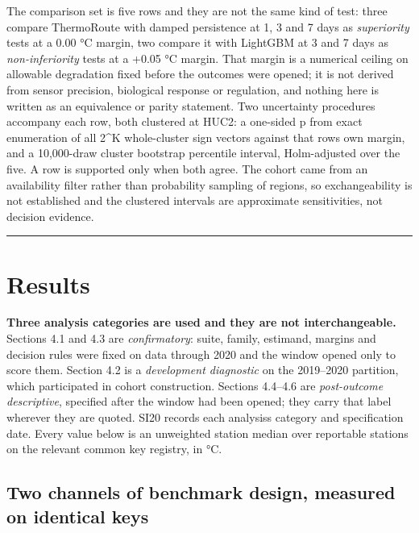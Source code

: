 The comparison set is five rows and they are not the same kind of test: three
compare ThermoRoute with damped persistence at 1, 3 and 7 days as \emph{superiority}
tests at a 0.00 °C margin, two compare it with LightGBM at 3 and 7 days as
\emph{non-inferiority} tests at a +0.05 °C margin. That margin is a numerical ceiling
on allowable degradation fixed before the outcomes were opened; it is not derived
from sensor precision, biological response or regulation, and nothing here is
written as an equivalence or parity statement. Two uncertainty procedures
accompany each row, both clustered at HUC2: a one-sided p from exact enumeration
of all 2\^{}K whole-cluster sign vectors against that row\textquotesingle s own margin, and a
10,000-draw cluster bootstrap percentile interval, Holm-adjusted
\cite{holm1979simple} over the five. A row is
supported only when both agree. The cohort came from an availability filter
rather than probability sampling of regions, so exchangeability is not
established and the clustered intervals are approximate sensitivities, not
decision evidence.

\begin{center}\rule{0.5\linewidth}{0.5pt}\end{center}

\section{Results}\label{results}

\textbf{Three analysis categories are used and they are not interchangeable.} Sections
4.1 and 4.3 are \emph{confirmatory}: suite, family, estimand, margins and decision
rules were fixed on data through 2020 and the window opened only to score them.
Section 4.2 is a \emph{development diagnostic} on the 2019--2020 partition, which
participated in cohort construction. Sections 4.4--4.6 are \emph{post-outcome
descriptive}, specified after the window had been opened; they carry that label
wherever they are quoted. SI20 records each analysis\textquotesingle s category and
specification date. Every value below is an unweighted station median over
reportable stations on the relevant common key registry, in °C.

\subsection{Two channels of benchmark design, measured on identical keys}\label{two-channels-of-benchmark-design-measured-on-identical-keys}

